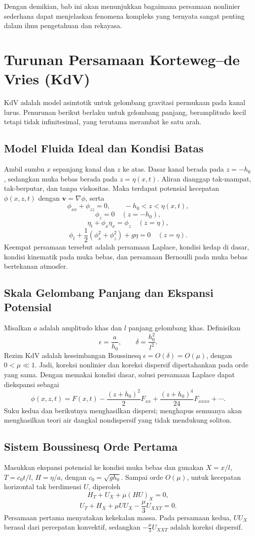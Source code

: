 \documentclass{bukumjh}
\begin{document}
Dengan demikian, bab ini akan menunjukkan bagaimana persamaan nonlinier sederhana dapat menjelaskan fenomena kompleks yang ternyata sangat penting dalam ilmu pengetahuan dan rekayasa.

\section{Turunan Persamaan Korteweg--de Vries (KdV)}

KdV adalah model asimtotik untuk gelombang gravitasi permukaan pada kanal lurus. Penurunan berikut berlaku untuk gelombang panjang, beramplitudo kecil tetapi tidak infinitesimal, yang terutama merambat ke satu arah.

\subsection{Model Fluida Ideal dan Kondisi Batas}
Ambil sumbu $x$ sepanjang kanal dan $z$ ke atas. Dasar kanal berada pada $z=-h_0$, sedangkan muka bebas berada pada $z=\eta(x,t)$. Aliran dianggap tak-mampat, tak-berputar, dan tanpa viskositas. Maka terdapat potensial kecepatan $\phi(x,z,t)$ dengan $\boldsymbol{v}=\nabla\phi$, serta
\[
\phi_{xx}+\phi_{zz}=0, \qquad -h_0<z<\eta(x,t),
\]
\[
\phi_z=0 \quad (z=-h_0),
\]
\[
\eta_t+\phi_x\eta_x=\phi_z \quad (z=\eta),
\]
\[
\phi_t+\frac12\left(\phi_x^2+\phi_z^2\right)+g\eta=0 \quad (z=\eta).
\]
Keempat persamaan tersebut adalah persamaan Laplace, kondisi kedap di dasar, kondisi kinematik pada muka bebas, dan persamaan Bernoulli pada muka bebas bertekanan atmosfer.

\subsection{Skala Gelombang Panjang dan Ekspansi Potensial}
Misalkan $a$ adalah amplitudo khas dan $l$ panjang gelombang khas. Definisikan
\[
\epsilon=\frac{a}{h_0}, \qquad \delta=\frac{h_0^2}{l^2}.
\]
Rezim KdV adalah keseimbangan Boussinesq $\epsilon=O(\delta)=O(\mu)$, dengan $0<\mu\ll1$. Jadi, koreksi nonlinier dan koreksi dispersif dipertahankan pada orde yang sama. Dengan memakai kondisi dasar, solusi persamaan Laplace dapat diekspansi sebagai
\[
\phi(x,z,t)=F(x,t)-\frac{(z+h_0)^2}{2}F_{xx}+\frac{(z+h_0)^4}{24}F_{xxxx}+\cdots.
\]
Suku kedua dan berikutnya menghasilkan dispersi; menghapus semuanya akan menghasilkan teori air dangkal nondispersif yang tidak mendukung soliton.

\subsection{Sistem Boussinesq Orde Pertama}
Masukkan ekspansi potensial ke kondisi muka bebas dan gunakan $X=x/l$, $T=c_0t/l$, $H=\eta/a$, dengan $c_0=\sqrt{gh_0}$. Sampai orde $O(\mu)$, untuk kecepatan horizontal tak berdimensi $U$, diperoleh
\[
H_T+U_X+\mu(HU)_X=0,
\]
\[
U_T+H_X+\mu U U_X-\frac{\mu}{3}U_{XXT}=0.
\]
Persamaan pertama menyatakan kekekalan massa. Pada persamaan kedua, $UU_X$ berasal dari percepatan konvektif, sedangkan $-\frac{\mu}{3}U_{XXT}$ adalah koreksi dispersif.
\end{document}
